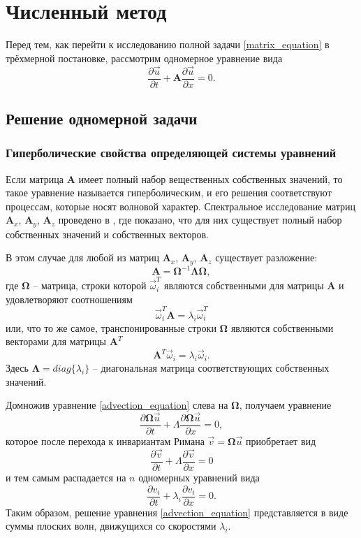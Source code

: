 \section{Численный метод}

Перед тем, как перейти к исследованию полной задачи \ref{matrix_equation} в трёхмерной постановке, рассмотрим одномерное уравнение вида
\begin{equation}
\frac{\partial\vec{u}}{\partial{t}}+\mathbf{A}\frac{\partial\vec{u}}{\partial{x}}=0.
\label{advection_equation}
\end{equation}

\subsection{Решение одномерной задачи}

\subsubsection{Гиперболические свойства определяющей системы уравнений}

Если матрица $\mathbf{A}$ имеет полный набор вещественных собственных значений, 
то такое уравнение называется гиперболическим, и его решения соответствуют 
процессам, которые носят волновой характер. Спектральное исследование матриц $\mathbf{A}_x$, $\mathbf{A}_y$, $\mathbf{A}_z$ проведено в \cite{chelnokov}, где показано, что для них существует полный набор собственных значений и собственных векторов.

В этом случае для любой из матриц $\mathbf{A}_x$, $\mathbf{A}_y$, $\mathbf{A}_z$ существует разложение:
$$\mathbf{A}=\mathbf\Omega^{-1}\mathbf\Lambda\mathbf\Omega,$$
где $\mathbf\Omega$ -- матрица, строки которой $\vec\omega_i^T$ являются собственными для матрицы $\mathbf A$ и
удовлетворяют соотношениям
$$\vec\omega_i^T\mathbf A=\lambda_i\vec\omega_i^T$$ или, что то же самое, транспонированные строки $\mathbf\Omega$ являются собственными векторами для матрицы $\mathbf A^T$
$$\mathbf A^T\vec\omega_i=\lambda_i\vec\omega_i.$$
Здесь $\mathbf\Lambda=diag\{\lambda_i\}$ -- диагональная матрица соответствующих собственных значений.

Домножив уравнение \ref{advection_equation} слева на $\mathbf\Omega$, получаем уравнение
$$\frac{\partial{\mathbf\Omega{\vec u}}}{\partial t}+
\Lambda\frac{\partial{\mathbf\Omega{\vec u}}}{\partial x}=0,$$
которое после перехода к инвариантам Римана ${\vec v}=\mathbf\Omega{\vec u}$ приобретает вид
$$\frac{\partial{\vec v}}{\partial t}+
\Lambda\frac{\partial{\vec v}}{\partial x}=0$$
и тем самым распадается на $n$ одномерных уравнений вида
\begin{equation}
\frac{\partial{v_i}}{\partial t}+\lambda_i\frac{\partial{v_i}}{\partial x}=0.
\label{advection_equation_splitted}
\end{equation}
Таким образом, решение уравнения \ref{advection_equation} представляется в виде
суммы плоских волн, движущихся со скоростями $\lambda_i$.

